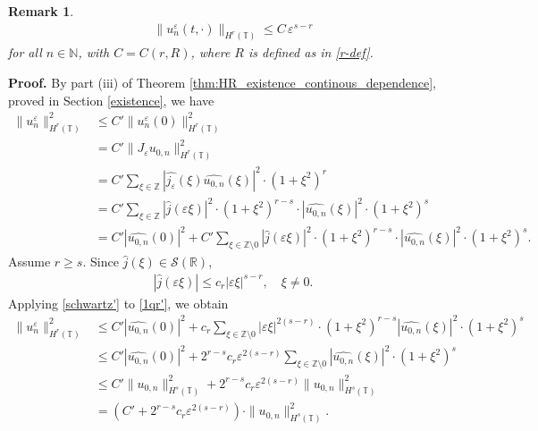 \documentclass[12pt,reqno]{amsart}
\newcommand{\rr}{\mathbb{R}}
\newcommand{\zz}{\mathbb{Z}}
\newcommand{\ci}{\mathbb{T}}
\newcommand{\ee}{\varepsilon}
\theoremstyle{plain}  %
\newtheorem{remark}{Remark}
\theoremstyle{definition}
\begin{document}
\begin{appendices}
\begin{remark}
\begin{equation}
		\begin{split}
			\|u^\ee_n (t, \cdot) \|_{H^r(\ci)} \le C \, \ee^{s-r}
			\label{700r'}
		\end{split}
	\end{equation}
	for all $n \in \mathbb{N}$, with $C = C(r, R)$, where $R$ is defined as
	in \eqref{r-def}.
\end{remark}
{\bf Proof.} By part (iii) of Theorem
\ref{thm:HR_existence_continous_dependence}, proved in Section
\ref{existence}, we have
\begin{equation}
	\begin{split}
		\|u^\ee_n \|_{H^r(\ci)}^2
		& \le C' \|u^\ee_n (0)\|_{H^r(\ci)}^2
		\\
		& = C' \|J_\ee u_{0,n}\|_{H^r(\ci)}^2
		\\
		& = C' \sum_{\xi \in \zz} |\widehat{j_\ee} (\xi) \widehat{u_{0,n}}(\xi)
		|^2 \cdot (1 + \xi^2)^r
		\\
		& = C' \sum_{\xi \in \zz} |\widehat{j }(\ee \xi)|^2 \cdot (1 +
		\xi^2)^{r-s} \cdot |\widehat{u_{0,n}}(\xi)|^2 \cdot (1 + \xi^2)^s
		\\
		& = C'|\widehat{u_{0,n}}(0)|^2 +
		C' \sum_{\xi \in \zz \setminus {0}} |\widehat{j }(\ee \xi)|^2 \cdot (1 +
		\xi^2)^{r-s} \cdot |\widehat{u_{0,n}}(\xi)|^2 \cdot (1 + \xi^2)^s.
		\label{1qr'}
	\end{split}
\end{equation}
Assume $r \ge s$. Since $\widehat{j }(\xi) \in \mathcal{S}(\rr)$, 
\begin{equation}
	\label{schwartz'}
	\begin{split}
		|\widehat{j }(\ee \xi)| \le c_r |\ee \xi |^{s-r}, \quad \xi \neq 0.
	\end{split}
\end{equation}
Applying \eqref{schwartz'} to \eqref{1qr'}, we obtain
\begin{equation}
	\label{calc_ue'}
	\begin{split}
		\|u^\ee_n \|_{H^r(\ci)}^2 
		& \le C' |\widehat{u_{0,n}}(0) |^2 + c_r \sum_{\xi \in \zz \setminus
		{0}} |\ee \xi |^{2(s-r)} \cdot (1 + \xi^2)^{r-s}
		|\widehat{u_{0,n}}(\xi) |^2 \cdot (1 + \xi^2)^s
		\\
		& \le C' |\widehat{u_{0,n}}(0) |^2 + 2^{r-s} c_r \ee^{2(s-r)}
		\sum_{\xi \in \zz \setminus {0}} |\widehat{u_{0,n}}(\xi)|^2 \cdot (1 +
		\xi^2)^s
		\\
		& \le C' \|u_{0,n}\|_{H^s(\ci)}^2 + 2^{r-s} c_r \ee^{2(s-r)}
		\|u_{0,n}\|_{H^s(\ci)}^2
		\\
		& = (C' + 2^{r-s} c_r \ee^{2(s-r)}) \cdot \|u_{0,n}\|^2_{H^s(\ci)}.

\end{split}
\end{equation}
\end{appendices}
\end{document}
